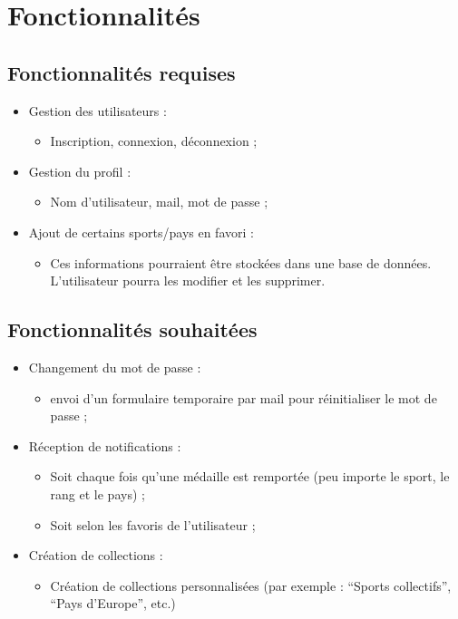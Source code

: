 \documentclass[12pt]{article}
\begin{document}
	\section{Fonctionnalités}
	
	\subsection{Fonctionnalités requises}
	
	\begin{itemize}
		\item Gestion des utilisateurs :
		\begin{itemize}
			\item Inscription, connexion, déconnexion ;
		\end{itemize}
		\item Gestion du profil :
		\begin{itemize}
			\item Nom d'utilisateur, mail, mot de passe ;
		\end{itemize}
		\item Ajout de certains sports/pays en favori :
		\begin{itemize}
			\item Ces informations pourraient être stockées dans une base de données. L'utilisateur pourra les modifier et les supprimer.
		\end{itemize}
	\end{itemize}

	\subsection{Fonctionnalités souhaitées}
	
	\begin{itemize}
		\item Changement du mot de passe :
		\begin{itemize}
			\item envoi d'un formulaire temporaire par mail pour réinitialiser le mot de passe ;
		\end{itemize}
		\item Réception de notifications :
		\begin{itemize}
			\item Soit chaque fois qu'une médaille est remportée (peu importe le sport, le rang et le pays) ;
			\item Soit selon les favoris de l'utilisateur ;
		\end{itemize}
		\item Création de collections :
		\begin{itemize}
			\item Création de collections personnalisées (par exemple : \enquote{Sports collectifs}, \enquote{Pays d'Europe}, etc.)
		\end{itemize}
	\end{itemize}
	
\end{document}
